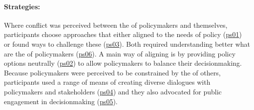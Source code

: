 \paragraph{Strategies:}
Where conflict was perceived between the \skipers{} of policymakers and themselves, participants choose approaches that either aligned to the needs of policy (\hyperref[tab:resskipersstrat]{ps01}) or found ways to challenge these \skipers{} (\hyperref[tab:resskipersstrat]{ps03}). Both required understanding better what are the \skipers{} of policymakers (\hyperref[tab:resskipersstrat]{ps06}). A main way of aligning is by providing policy options neutrally (\hyperref[tab:resskipersstrat]{ps02}) to allow policymakers to balance their decisionmaking. Because policymakers \skipers{} were perceived to be constrained by the \skipers{} of others, participants used a range of means of creating diverse dialogues with policymakers and stakeholders (\hyperref[tab:resskipersstrat]{ps04}) and they also advocated for public engagement in decisionmaking (\hyperref[tab:resskipersstrat]{ps05}).

\subsubsection{\titopin}\label{sec:resskiopin}

